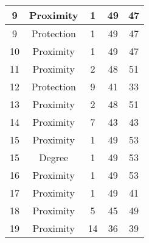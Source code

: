 \documentclass[results.tex]{subfiles}
\begin{document}
\begin{center}
\begin{tabular}{| c || c | c | c | c |}
            \hline
            9                       & Proximity                    & 1                      & 49                      & 47                   \\
            \hline
            9                       & Protection                   & 1                      & 49                      & 47                   \\
            \hline
            10                      & Proximity                    & 1                      & 49                      & 47                   \\
            \hline
            11                      & Proximity                    & 2                      & 48                      & 51                   \\
            \hline
            12                      & Protection                   & 9                      & 41                      & 33                   \\
            \hline
            13                      & Proximity                    & 2                      & 48                      & 51                   \\
            \hline
            14                      & Proximity                    & 7                      & 43                      & 43                   \\
            \hline
            15                      & Proximity                    & 1                      & 49                      & 53                   \\
            \hline
            15                      & Degree                       & 1                      & 49                      & 53                   \\
            \hline
            16                      & Proximity                    & 1                      & 49                      & 53                   \\
            \hline
            17                      & Proximity                    & 1                      & 49                      & 41                   \\
            \hline
            18                      & Proximity                    & 5                      & 45                      & 49                   \\
            \hline
            19                      & Proximity                    & 14                     & 36                      & 39                   \\

\end{tabular}
\end{center}
\end{document}
